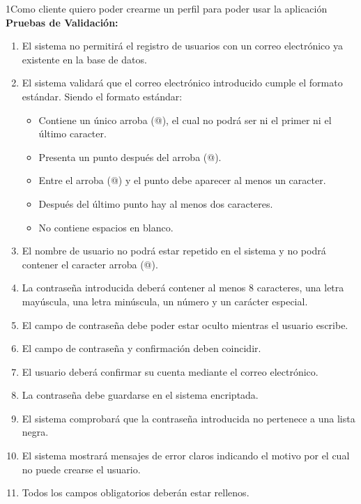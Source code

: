 \begin{hu_card}{1}{Como cliente quiero poder crearme un perfil para poder usar la aplicación}
    \vspace{2mm}
    \textbf{Pruebas de Validación:}
    \begin{enumerate}[noitemsep, topsep=0pt]
        \item El sistema no permitirá el registro de usuarios con un correo electrónico ya existente en la base de datos.
        \item El sistema validará que el correo electrónico introducido cumple el formato estándar. Siendo el formato estándar:
            \begin{itemize}
                \item Contiene un único arroba (@), el cual no podrá ser ni el primer ni el último caracter.
                \item Presenta un punto después del arroba (@).
                \item Entre el arroba (@) y el punto debe aparecer al menos un caracter.
                \item Después del último punto hay al menos dos caracteres.
                \item No contiene espacios en blanco.
            \end{itemize}
        \item El nombre de usuario no podrá estar repetido en el sistema y no podrá contener el caracter arroba (@).
        \item La contraseña introducida deberá contener al menos 8 caracteres, una letra mayúscula, una letra minúscula, un número y un carácter especial.
        \item El campo de contraseña debe poder estar oculto mientras el usuario escribe.
        \item El campo de contraseña y confirmación deben coincidir.
        \item El usuario deberá confirmar su cuenta mediante el correo electrónico.
        \item La contraseña debe guardarse en el sistema encriptada.
        \item El sistema comprobará que la contraseña introducida no pertenece a una lista negra.
        \item El sistema mostrará mensajes de error claros indicando el motivo por el cual no puede crearse el usuario.
        \item Todos los campos obligatorios deberán estar rellenos.
    \end{enumerate}
\end{hu_card}

